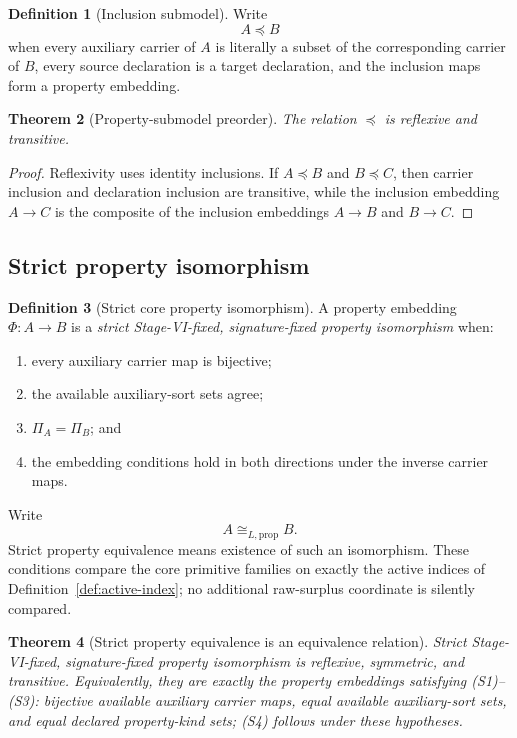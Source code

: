 \documentclass[11pt]{article}
\newtheorem{theorem}{Theorem}[section]
\theoremstyle{definition}
\newtheorem{definition}[theorem]{Definition}
\theoremstyle{remark}
\begin{document}
\begin{definition}[Inclusion submodel]
Write
\[
A\preccurlyeq B
\]
when every auxiliary carrier of \(A\) is literally a subset of the corresponding carrier of \(B\), every source declaration is a target declaration, and the inclusion maps form a property embedding.
\end{definition}

\begin{theorem}[Property-submodel preorder]
The relation \(\preccurlyeq\) is reflexive and transitive.
\end{theorem}

\begin{proof}
Reflexivity uses identity inclusions.
If \(A\preccurlyeq B\) and \(B\preccurlyeq C\), then carrier inclusion and declaration inclusion are transitive, while the inclusion embedding \(A\to C\) is the composite of the inclusion embeddings \(A\to B\) and \(B\to C\).
\end{proof}

\subsection{Strict property isomorphism}

\begin{definition}[Strict core property isomorphism]
\label{def:strict-iso}
A property embedding \(\Phi:A\to B\) is a \emph{strict Stage-VI-fixed, signature-fixed property isomorphism} when:
\begin{enumerate}[label=(S\arabic*)]
\item every auxiliary carrier map is bijective;
\item the available auxiliary-sort sets agree;
\item \(\Pi_A=\Pi_B\); and
\item the embedding conditions hold in both directions under the inverse carrier maps.
\end{enumerate}
Write
\[
A\cong_{L,\mathrm{prop}} B.
\]
Strict property equivalence means existence of such an isomorphism.
These conditions compare the core primitive families on exactly the
active indices of Definition~\ref{def:active-index}; no additional
raw-surplus coordinate is silently compared.
\end{definition}

\begin{theorem}[Strict property equivalence is an equivalence relation]
\label{thm:strict-equivalence}
Strict Stage-VI-fixed, signature-fixed property isomorphism is reflexive, symmetric, and transitive.
Equivalently, they are exactly the property embeddings satisfying (S1)--(S3): bijective available auxiliary carrier maps, equal available auxiliary-sort sets, and equal declared property-kind sets; (S4) follows under these hypotheses.
\end{theorem}
\end{document}
